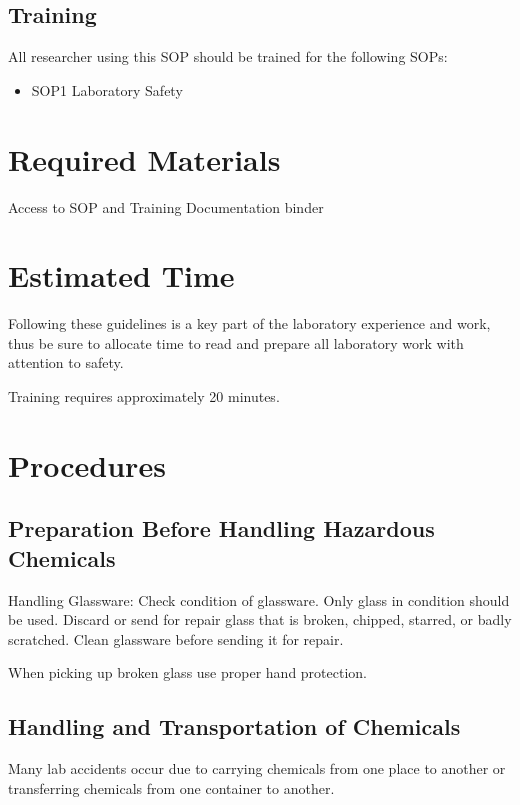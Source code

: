 \documentclass[12pt]{../SOP4_alpha}\usepackage[]{graphicx}\usepackage[]{color}
\begin{document}
\subsection*{Training}

\NP All researcher using this SOP should be trained for the following SOPs:

\begin{itemize}
  \item SOP1 Laboratory Safety
\end{itemize}

\section{Required Materials}

\NP Access to SOP and Training Documentation binder

\section{Estimated Time}

\NP Following these guidelines is a key part of the laboratory experience and work, thus be sure to allocate time to read and prepare all laboratory work with attention to safety.

\NP Training requires approximately 20 minutes.


\section{Procedures}

\subsection*{Preparation Before Handling Hazardous Chemicals}

\NP Handling Glassware: Check condition of glassware. Only glass in condition should be used. Discard or send for repair glass that is broken, chipped, starred, or badly scratched. Clean glassware before sending it for repair. 

\NP When picking up broken glass use proper hand protection.

\subsection*{Handling and Transportation of Chemicals}

\NP Many lab accidents occur due to carrying chemicals from one place to another or transferring chemicals from one container to another. 
\end{document}
